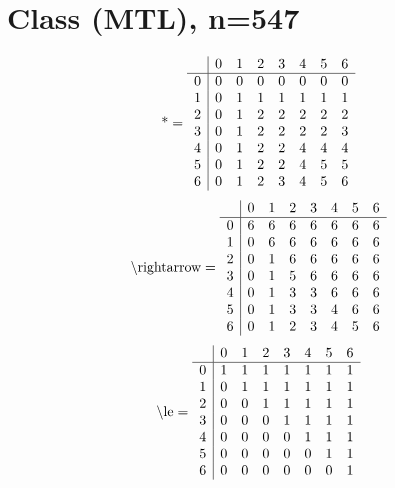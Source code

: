 \documentclass[11pt]{article}
\begin{document}
\section{Class (MTL), n=547}
\[\text{*} = 
\begin{array}{r | r r r r r r r}
 & 0 & 1 & 2 & 3 & 4 & 5 & 6 \\ \hline
0 & 0 & 0 & 0 & 0 & 0 & 0 & 0 \\
1 & 0 & 1 & 1 & 1 & 1 & 1 & 1 \\
2 & 0 & 1 & 2 & 2 & 2 & 2 & 2 \\
3 & 0 & 1 & 2 & 2 & 2 & 2 & 3 \\
4 & 0 & 1 & 2 & 2 & 4 & 4 & 4 \\
5 & 0 & 1 & 2 & 2 & 4 & 5 & 5 \\
6 & 0 & 1 & 2 & 3 & 4 & 5 & 6 \\
\end{array}
\]
\[\text{\textbackslash rightarrow} = 
\begin{array}{r | r r r r r r r}
 & 0 & 1 & 2 & 3 & 4 & 5 & 6 \\ \hline
0 & 6 & 6 & 6 & 6 & 6 & 6 & 6 \\
1 & 0 & 6 & 6 & 6 & 6 & 6 & 6 \\
2 & 0 & 1 & 6 & 6 & 6 & 6 & 6 \\
3 & 0 & 1 & 5 & 6 & 6 & 6 & 6 \\
4 & 0 & 1 & 3 & 3 & 6 & 6 & 6 \\
5 & 0 & 1 & 3 & 3 & 4 & 6 & 6 \\
6 & 0 & 1 & 2 & 3 & 4 & 5 & 6 \\
\end{array}
\]
\[\text{\textbackslash le} = 
\begin{array}{r | r r r r r r r}
 & 0 & 1 & 2 & 3 & 4 & 5 & 6 \\ \hline
0 & 1 & 1 & 1 & 1 & 1 & 1 & 1 \\
1 & 0 & 1 & 1 & 1 & 1 & 1 & 1 \\
2 & 0 & 0 & 1 & 1 & 1 & 1 & 1 \\
3 & 0 & 0 & 0 & 1 & 1 & 1 & 1 \\
4 & 0 & 0 & 0 & 0 & 1 & 1 & 1 \\
5 & 0 & 0 & 0 & 0 & 0 & 1 & 1 \\
6 & 0 & 0 & 0 & 0 & 0 & 0 & 1 \\
\end{array}
\]
\end{document}
